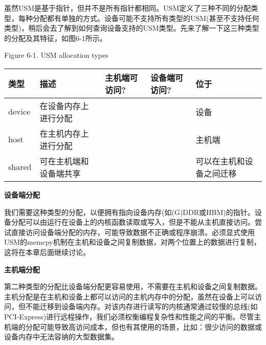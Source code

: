 虽然USM是基于指针，但并不是所有指针都相同。USM定义了三种不同的分配类型，每种分配都有单独的方式。设备可能不支持所有类型的USM(甚至不支持任何类型)，稍后会去了解到如何查询设备支持的USM类型。先来了解一下这三种类型的分配及其特征，如图6-1所示。\par

\hspace*{\fill} \par %
Figure 6-1. USM allocation types
\begin{table}[H]
	\begin{tabular}{|l|l|l|l|l|}
		\hline
		类型   & 描述                                & 主机端可访问? & 设备端可访问? & 位于                          \\ \hline
		device & 在设备内存上进行分配              & \XSolidBrush                   & \Checkmark                      & 设备                              \\ \hline
		host   & 在主机内存上进行分配                 & \Checkmark                   & \Checkmark                     & 主机端                                \\ \hline
		shared & 可在主机端和设备端共享 & \Checkmark                    & \Checkmark                     & 可以在主机和设备之间迁移 \\ \hline
	\end{tabular}
\end{table}

\hspace*{\fill} \par %
\textbf{设备端分配}

我们需要这种类型的分配，以便拥有指向设备内存(如(G)DDR或HBM)的指针。设备分配可以由运行在设备上的内核函数读取或写入，但是不能从主机直接访问。尝试直接访问设备端分配的内存，可能导致数据不正确或程序崩溃。必须显式使用USM的memcpy机制在主机和设备之间复制数据，对两个位置上的数据进行复制，这将在本章后面继续讨论。\par

\hspace*{\fill} \par %
\textbf{主机端分配}

第二种类型的分配比设备端分配更容易使用，不需要在主机和设备之间复制数据。主机分配是在主机和设备上都可以访问的主机内存中的分配，虽然在设备上可以访问，但不能迁移到设备端内存。对该内存进行读写的内核通常通过较慢的总线(如PCI-Express)进行远程操作，我们必须权衡编程复杂性和性能之间的平衡。尽管主机端的分配可能导致高访问成本，但也有其使用的场景，比如：很少访问的数据或设备内存中无法容纳的大型数据集。\par

